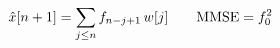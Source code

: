 \documentclass[preview]{standalone}
\begin{document}
\begin{align*}
\special{dvisvgm:raw <g id='unique000'>}\hat{x}[n+1]=\sum_{j\le n} f_{n-j+1}\,w[j]\qquad \text{MMSE}=f_0^2\special{dvisvgm:raw </g>}
\end{align*}
\end{document}
